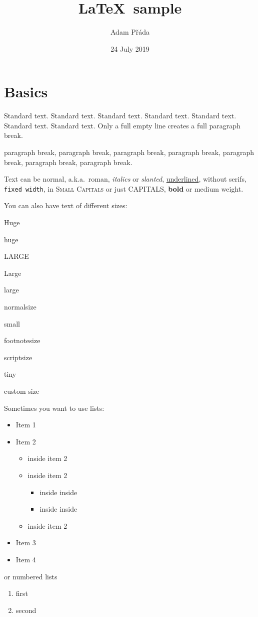 \documentclass[11pt]{article}
\title{\LaTeX\ sample}
\author{Adam Přáda}
\date{24 July 2019}
\begin{document}
\maketitle
\section{Basics}
Standard text. Standard text. Standard text. Standard text. Standard text. Standard text. Standard text.
Only a full empty line creates a full paragraph break.

paragraph break, paragraph break, paragraph break, paragraph break, paragraph break, paragraph break, paragraph break.

Text can be \textnormal{normal}, a.k.a.~\textrm{roman}, \emph{italics} or \textsl{slanted}, \underline{underlined}, \textsf{without serifs}, \texttt{fixed width}, in \textsc{Small Capitals} or just \uppercase{capitals}, \textbf{bold} or \textmd{medium weight}.

You can also have text of different sizes:

{\Huge Huge}

{\huge huge}

{\LARGE LARGE}

{\Large Large}

{\large large}

{\normalsize normalsize}

{\small small}

{\footnotesize footnotesize}

{\scriptsize scriptsize}

{\tiny tiny}

{\fontsize{1.5cm}{2cm}\selectfont custom size}


\pagebreak
Sometimes you want to use lists:
\begin{itemize}
	\item Item 1
	\item Item 2
	\begin{itemize}
		\item inside item 2
		\item inside item 2
		\begin{itemize}
			\item inside inside
			\item inside inside
		\end{itemize}
		\item inside item 2
	\end{itemize}
	\item Item 3
	\item Item 4
\end{itemize}
or numbered lists
\begin{enumerate}
	\item first
	\item second
\end{enumerate}
\end{document}
